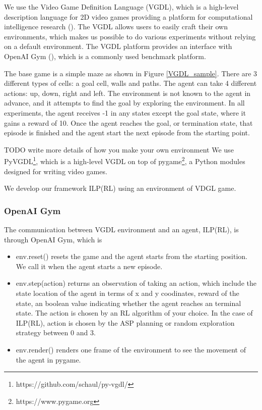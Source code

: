 We use the Video Game Definition Language (VGDL), which is a high-level description language for 2D video games providing a platform for computational intelligence research (\cite{Schaul2013}).
The VGDL allows users to easily craft their own environments, which makes us possible to do various experiments without relying on a default environment. The VGDL platform provides an interface with OpenAI Gym (\cite{Brockman2016}), which is a commonly used benchmark platform.

The base game is a simple maze as shown in Figure \ref{VGDL_sample}.
There are 3 different types of cells: a goal cell, walls and paths. The agent can take 4 different actions: up, down, right and left.
The environment is not known to the agent in advance, and it attempts to find the goal by exploring the environment.
In all experiments, the agent receives -1 in any states except the goal state, where it gains a reward of 10.
Once the agent reaches the goal, or termination state, that episode is finished and the agent start the next episode from the starting point.

TODO write more details of how you make your own environment
We use PyVGDL\footnote{https://github.com/schaul/py-vgdl/}, which is a high-level VGDL on top of pygame\footnote{https://www.pygame.org}, 
a Python modules designed for writing video games.


We develop our framework ILP(RL) using an environment of VDGL game.

\subsubsection{OpenAI Gym}
The communication between VGDL environment and an agent, ILP(RL), is through OpenAI Gym, which is 



\begin{itemize}
\item \textsf{env.reset()} resets the game and the agent starts from the starting position. We call it when the agent starts a new episode.
\item \textsf{env.step(action)} returns an observation of taking an action, which include the state location of the agent in terms of x and y coodinates, reward of the state, an boolean value indicating whether the agent reaches an terminal state.
The action is chosen by an RL algorithm of your choice. In the case of ILP(RL), action is chosen by the ASP planning or random exploration strategy between 0 and 3.
\item \textsf{env.render()} renders one frame of the environment to see the movement of the agent in pygame.
\end{itemize}

